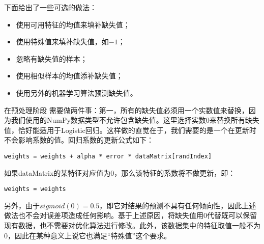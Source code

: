下面给出了一些可选的做法：
\begin{itemize}
    \item 使用可用特征的均值来填补缺失值；
    \item 使用特殊值来填补缺失值，如$-1$；
    \item 忽略有缺失值的样本；
    \item 使用相似样本的均值添补缺失值；
    \item 使用另外的机器学习算法预测缺失值。
\end{itemize}

在预处理阶段
需要做两件事：第一，所有的缺失值必须用一个实数值来替换，因为我们使用的NumPy数据类型不允许包含缺失值。这里选择实数0来替换所有缺失值，恰好能适用于Logistic回归。这样做的直觉在于，我们需要的是一个在更新时不会影响系数的值。回归系数的更新公式如下：

\verb|weights = weights + alpha * error * dataMatrix[randIndex]|

如果dataMatrix的某特征对应值为0，那么该特征的系数将不做更新，即：

\verb|weights = weights|

另外，由于$sigmoid(0)=0.5$，即它对结果的预测不具有任何倾向性，因此上述做法也不会对误差项造成任何影响。基于上述原因，将缺失值用0代替既可以保留现有数据，也不需要对优化算法进行修改。此外，该数据集中的特征取值一般不为0，因此在某种意义上说它也满足“特殊值”这个要求。